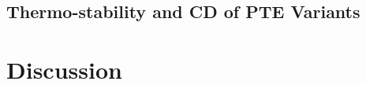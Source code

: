 \begin{refsection}
\subsection{Thermo-stability and CD of PTE Variants}

\section{Discussion}

\printbibliography[heading=subbibliography]

\end{refsection}
